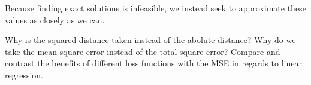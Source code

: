 Because finding exact solutions is infeasible, we instead seek to approximate
these values as closely as we can.




\begin{exercise}
    \ex Why is the squared distance taken instead of the abolute distance?
    \ex Why do we take the mean square error instead of the total square error?
    \ex Compare and contrast the benefits of different loss functions with the
    MSE in regards to linear regression.
\end{exercise}
